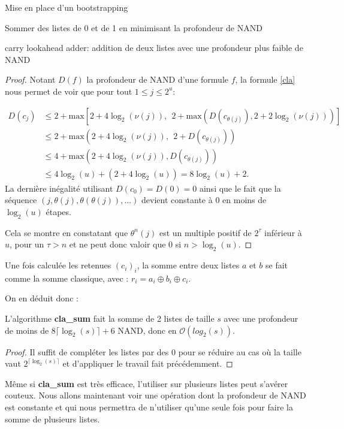 \begin{section}{Mise en place d'un bootstrapping}
\begin{subsection}{Sommer des listes de 0 et de 1 en minimisant la profondeur de NAND}
\begin{subsubsection}{carry lookahead adder: addition de deux listes avec une profondeur plus faible de NAND}
\begin{proof}
	Notant $D(f)$ la profondeur de NAND d'une formule $f$, la formule \eqref{cla} nous permet de voir que pour tout $1 \leqslant j \leqslant 2^u $:

\begin{align*}
D(c_j) &\leqslant 2 + \text{max}\left[2 + 4 \log_2(\nu(j)),\:\: 2 + \text{max}\left(D(c_{\theta(j)}), 2 + 2
\log_2(\nu(j))\right)\right] \\
&\leqslant 2 + \text{max}\left(2 + 4 \log_2(\nu(j)),\:\: 2 + D(c_{\theta(j)})\right) \\
&\leqslant 4 + \text{max}\left(2 + 4 \log_2(\nu(j)), D(c_{\theta(j)})\right) \\
& \leqslant 4 \log_2(u) + (2 + 4\log_2(u)) = 8 \log_2(u) + 2.
\end{align*}
La dernière inégalité utilisant $D(c_0) = D(0) = 0$ ainsi que le fait que la séquence $(j, \theta(j), \theta(\theta(j)),
...)$ devient constante à 0 en moins de $\log_2(u)$ étapes. 

Cela se montre en constatant que $\theta^n(j)$ est un multiple positif de $2^\tau$ inférieur à $u$, pour un 
$\tau > n$ et ne peut donc valoir que 0 si $n > \log_2(u)$.
\end{proof}

	Une fois calculée les retenues $(c_i)_i$, la somme entre deux listes $a$ et $b$ se fait comme la somme classique, avec : $r_i = a_i \oplus b_i \oplus c_i$.

	On en déduit donc :

\begin{thm}
\label{cla_sum}
	L'algorithme \textbf{cla\_sum} fait la somme de 2 listes de taille $s$ avec une profondeur de moins de $8 \lceil \log_2(s) \rceil + 6$ NAND, donc en $\mathcal{O}(log_2(s))$.
\end{thm}

\begin{proof}
	Il suffit de compléter les listes par des 0 pour se réduire au cas où la taille vaut $2^{\lceil \log_2(s) \rceil}$ et d'appliquer le travail fait précédemment.
\end{proof}
\end{subsubsection}

Même si \textbf{cla\_sum} est très efficace, l'utiliser sur plusieurs listes peut s'avérer couteux.
Nous allons maintenant voir une opération dont la profondeur de NAND est constante et qui nous permettra
de n'utiliser  qu'une seule fois pour faire la somme de plusieurs listes.


\end{subsection}
\end{section}
